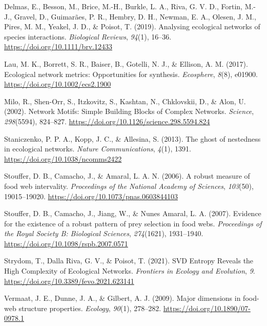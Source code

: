 \documentclass[
]{article}
\newlength{\cslhangindent}
\newenvironment{CSLReferences}[2] %
 {\begin{list}{}{%
  \setlength{\itemindent}{0pt}
  \setlength{\leftmargin}{0pt}
  \setlength{\parsep}{0pt}
  \ifodd #1
   \setlength{\leftmargin}{\cslhangindent}
   \setlength{\itemindent}{-1\cslhangindent}
  \fi
  \setlength{\itemsep}{#2\baselineskip}}}
 {\end{list}}
\begin{document}
\label{refs}
\begin{CSLReferences}{1}{0}
Delmas, E., Besson, M., Brice, M.-H., Burkle, L. A., Riva, G. V. D.,
Fortin, M.-J., Gravel, D., Guimarães, P. R., Hembry, D. H., Newman, E.
A., Olesen, J. M., Pires, M. M., Yeakel, J. D., \& Poisot, T. (2019).
Analysing ecological networks of species interactions. \emph{Biological
Reviews}, \emph{94}(1), 16--36. \url{https://doi.org/10.1111/brv.12433}

Lau, M. K., Borrett, S. R., Baiser, B., Gotelli, N. J., \& Ellison, A.
M. (2017). Ecological network metrics: Opportunities for synthesis.
\emph{Ecosphere}, \emph{8}(8), e01900.
\url{https://doi.org/10.1002/ecs2.1900}

Milo, R., Shen-Orr, S., Itzkovitz, S., Kashtan, N., Chklovskii, D., \&
Alon, U. (2002). Network {Motifs}: {Simple Building Blocks} of {Complex
Networks}. \emph{Science}, \emph{298}(5594), 824--827.
\url{https://doi.org/10.1126/science.298.5594.824}

Staniczenko, P. P. A., Kopp, J. C., \& Allesina, S. (2013). The ghost of
nestedness in ecological networks. \emph{Nature Communications},
\emph{4}(1), 1391. \url{https://doi.org/10.1038/ncomms2422}

Stouffer, D. B., Camacho, J., \& Amaral, L. A. N. (2006). A robust
measure of food web intervality. \emph{Proceedings of the National
Academy of Sciences}, \emph{103}(50), 19015--19020.
\url{https://doi.org/10.1073/pnas.0603844103}

Stouffer, D. B., Camacho, J., Jiang, W., \& Nunes Amaral, L. A. (2007).
Evidence for the existence of a robust pattern of prey selection in food
webs. \emph{Proceedings of the Royal Society B: Biological Sciences},
\emph{274}(1621), 1931--1940.
\url{https://doi.org/10.1098/rspb.2007.0571}

Strydom, T., Dalla Riva, G. V., \& Poisot, T. (2021). {SVD Entropy
Reveals} the {High Complexity} of {Ecological Networks}. \emph{Frontiers
in Ecology and Evolution}, \emph{9}.
\url{https://doi.org/10.3389/fevo.2021.623141}

Vermaat, J. E., Dunne, J. A., \& Gilbert, A. J. (2009). Major dimensions
in food-web structure properties. \emph{Ecology}, \emph{90}(1),
278--282. \url{https://doi.org/10.1890/07-0978.1}


\end{CSLReferences}
\end{document}

